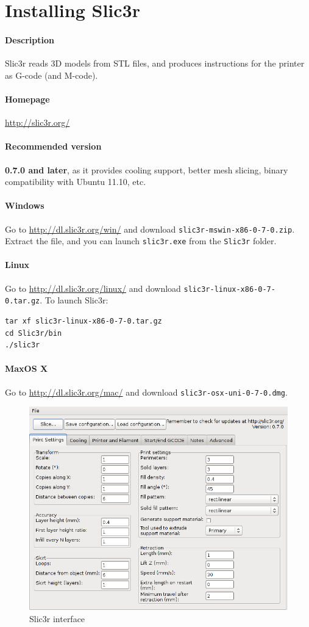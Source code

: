 \documentclass{article}
\begin{document}
\newpage

\section{Installing Slic3r}

	\paragraph{Description} Slic3r reads 3D models from STL files, and produces instructions for the printer as G-code (and M-code).

	\paragraph{Homepage} \url{http://slic3r.org/}

	\paragraph{Recommended version} \textbf{0.7.0 and later}, as it provides cooling support, better mesh slicing, binary compatibility with Ubuntu 11.10, etc.

	\paragraph{Windows} Go to \url{http://dl.slic3r.org/win/} and download \texttt{slic3r-mswin-x86-0-7-0.zip}. Extract the file, and you can launch \texttt{slic3r.exe} from the \texttt{Slic3r} folder.

	\paragraph{Linux} Go to \url{http://dl.slic3r.org/linux/} and download \texttt{slic3r-linux-x86-0-7-0.tar.gz}. To launch Slic3r:
		\begin{verbatim}
tar xf slic3r-linux-x86-0-7-0.tar.gz
cd Slic3r/bin
./slic3r
		\end{verbatim}

	\paragraph{MaxOS X} Go to \url{http://dl.slic3r.org/mac/} and download \texttt{slic3r-osx-uni-0-7-0.dmg}. %

	\begin{figure}[h!]
		\centering
		\includegraphics[width=0.6\linewidth]{slic3r.png}
		\caption{Slic3r interface}
	\end{figure}
\end{document}
